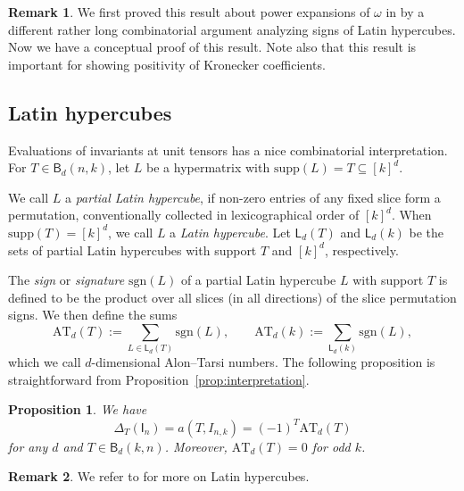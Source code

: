 \documentclass[12pt, reqno]{amsart}
\newtheorem{proposition}[theorem]{Proposition}
\theoremstyle{definition}
\newtheorem{remark}{Remark}[section]
\newcommand{\sgn}{\mathrm{sgn}}
\begin{document}
\begin{remark}
We first proved this result about power expansions of $\omega$ in \cite{ayfund} by a different rather long combinatorial argument analyzing signs of Latin hypercubes. Now we have a conceptual proof of this result. Note also that this result is important for showing positivity of Kronecker coefficients. 
\end{remark}

\subsection{Latin hypercubes}\label{sec:latin}
    Evaluations of invariants at unit tensors has a nice combinatorial interpretation. For $T \in \mathsf{B}_d(n,k)$, let $L$ be a hypermatrix with $\mathrm{supp}(L) = T \subseteq [k]^d$. 
    
    We call $L$ a \textit{partial Latin hypercube}, if non-zero entries of any fixed slice form a permutation, conventionally collected in lexicographical order of $[k]^d$. When $\mathrm{supp}(T) = [k]^d$, we call $L$ a \textit{Latin hypercube}. Let $\mathsf{L}_d(T)$ and $\mathsf{L}_d(k)$ be the sets of partial Latin hypercubes with support $T$ and $[k]^d$, respectively. 
    
    The \textit{sign} or \textit{signature} $\sgn(L)$ of a partial Latin hypercube $L$ with support $T$ is defined to be the product over all slices (in all directions) of the slice permutation signs. We then define the sums
    $$
        \mathrm{AT}_d(T) := \sum_{L \in \mathsf{L}_d(T)} \sgn(L), \qquad 
        \mathrm{AT}_d(k) := \sum_{\mathsf{L}_d(k)} \sgn(L),
    $$
    which we call {$d$-dimensional Alon--Tarsi numbers}. 
    The following proposition is straightforward from Proposition~\ref{prop:interpretation}.
    \begin{proposition}
    We have 
        $$\Delta_T(\mathsf{I}_n) = a(T, I_{n,k}) = (-1)^T \mathrm{AT}_d(T)$$ for any $d$ and $T \in \mathsf{B}_d(k, n)$. Moreover, $\mathrm{AT}_d(T) = 0$ for odd $k$. 
    \end{proposition}
    
 \begin{remark}
 We refer to \cite{ayfund} for more on Latin hypercubes. 
 \end{remark}
\end{document}
